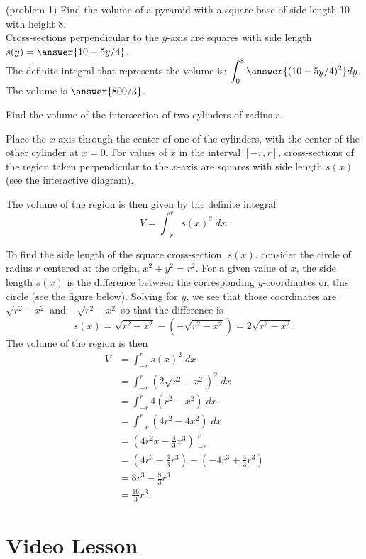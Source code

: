 \documentclass{ximera}
\begin{document}
 
 
\begin{problem}(problem 1) Find the volume of a pyramid with a square base of side length 10 with height 8.\\
Cross-sections perpendicular to the $y$-axis are squares with side length $s(y) = \answer{10 - 5y/4}$.\\
The definite integral that represents the volume is: $\displaystyle{\int_0^8 \answer{(10 - 5y/4)^2} dy}$.\\
The volume is $\answer{800/3}$.
\end{problem}


\begin{example}  Find the volume of the intersection of two cylinders of radius $r$. 


Place the $x$-axis through the center of one of the cylinders, with the center of the other cylinder at $x = 0$.
For values of $x$ in the interval $[-r, r]$, cross-sections of the region taken perpendicular 
to the $x$-axis are squares with side length $s(x)$ (see the interactive diagram). 

The volume of the region is then given by the definite integral
\[
V = \int_{-r}^r s(x)^2 \; dx.
\]

To find the side length of the square cross-section, $s(x)$, consider the circle of radius $r$ centered at the origin, $x^2 + y^2 = r^2$. For a given value of $x$, the side 
length $s(x)$ is the difference between the corresponding $y$-coordinates on this circle (see the figure below). Solving for $y$, we see that those coordinates are 
$\sqrt{r^2 - x^2}$ and $-\sqrt{r^2 - x^2}$ so that the difference is 
\[
s(x) = \sqrt{r^2 - x^2}-(-\sqrt{r^2 - x^2}) = 2\sqrt{r^2 - x^2}.
\]
The volume of the region  is then
\begin{align*}
V &= \int_{-r}^r s(x)^2 \; dx\\
  &= \int_{-r}^r \left(2\sqrt{r^2 - x^2}\right)^2 \; dx\\
  &= \int_{-r}^r 4(r^2 - x^2) \; dx\\
  &= \int_{-r}^r (4r^2 - 4x^2) \; dx\\
  &= \left(4r^2x - \frac43x^3\right)\bigg|_{-r}^r\\
  &= \left(4r^3 - \frac43r^3\right) - \left(-4r^3 + \frac43 r^3\right)\\
  &= 8r^3 - \frac83 r^3\\
  &= \frac{16}{3} r^3.
\end{align*}

\end{example}



\section{Video Lesson}

\begin{center}
\begin{foldable}
\end{foldable}
\end{center}
\end{document}
